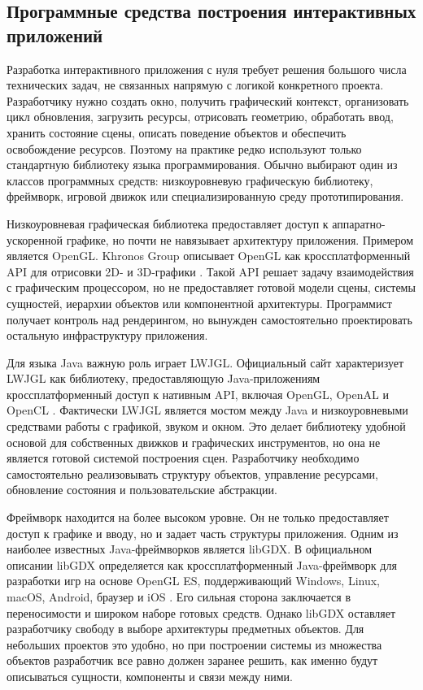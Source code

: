 \subsection{Программные средства построения интерактивных приложений}

Разработка интерактивного приложения с нуля требует решения большого
числа технических задач, не связанных напрямую с логикой конкретного
проекта. Разработчику нужно создать окно, получить графический контекст,
организовать цикл обновления, загрузить ресурсы, отрисовать геометрию,
обработать ввод, хранить состояние сцены, описать поведение объектов и
обеспечить освобождение ресурсов. Поэтому на практике редко используют
только стандартную библиотеку языка программирования. Обычно выбирают
один из классов программных средств: низкоуровневую графическую
библиотеку, фреймворк, игровой движок или специализированную среду
прототипирования.

Низкоуровневая графическая библиотека предоставляет доступ к
аппаратно-ускоренной графике, но почти не навязывает архитектуру
приложения. Примером является OpenGL. Khronos Group описывает OpenGL как
кроссплатформенный API для отрисовки 2D- и 3D-графики
\cite{khronos-opengl}. Такой API решает задачу взаимодействия с графическим
процессором, но не предоставляет готовой модели сцены, системы сущностей,
иерархии объектов или компонентной архитектуры. Программист получает
контроль над рендерингом, но вынужден самостоятельно проектировать
остальную инфраструктуру приложения.

Для языка Java важную роль играет LWJGL. Официальный сайт
характеризует LWJGL как библиотеку, предоставляющую Java-приложениям
кроссплатформенный доступ к нативным API, включая OpenGL, OpenAL и OpenCL
\cite{lwjgl}. Фактически LWJGL является мостом между Java и низкоуровневыми
средствами работы с графикой, звуком и окном. Это делает библиотеку
удобной основой для собственных движков и графических инструментов, но
она не является готовой системой построения сцен. Разработчику необходимо
самостоятельно реализовывать структуру объектов, управление ресурсами,
обновление состояния и пользовательские абстракции.

Фреймворк находится на более высоком уровне. Он не только
предоставляет доступ к графике и вводу, но и задает часть структуры
приложения. Одним из наиболее известных Java-фреймворков является
libGDX. В официальном описании libGDX определяется как кроссплатформенный
Java-фреймворк для разработки игр на основе OpenGL ES, поддерживающий
Windows, Linux, macOS, Android, браузер и iOS \cite{libgdx}. Его сильная
сторона заключается в переносимости и широком наборе готовых средств.
Однако libGDX оставляет разработчику свободу в выборе архитектуры
предметных объектов. Для небольших проектов это удобно, но при построении
системы из множества объектов разработчик все равно должен заранее
решить, как именно будут описываться сущности, компоненты и связи между
ними.

